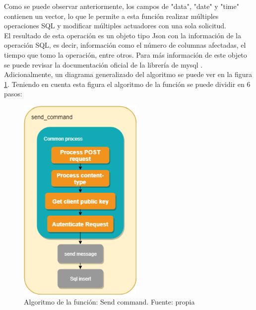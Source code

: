 Como se puede observar anteriormente, los campos de "data", "date" y "time" contienen un vector, lo que le permite a esta función realizar múltiples operaciones SQL y modificar múltiples actuadores con una sola solicitud.
\vspace{0.5cm}\\
El resultado de esta operación es un objeto tipo Json con la información de la operación SQL, es decir, información como el número de columnas afectadas, el tiempo que tomo la operación, entre otros. Para más información de este objeto se puede revisar la documentación oficial de la librería de mysql \cite{mysql}.
\vspace{0.5cm}\\
Adicionalmente, un diagrama generalizado del algoritmo se puede ver en la figura \ref{fig_29}. Teniendo en cuenta esta figura el algoritmo de la función se puede dividir en 6 pasos:

\begin{figure}[htbp]
	\centerline{\includegraphics[width=6cm]{figuras/algoritmo_send_command.png}}
	\caption{Algoritmo de la función: Send command. Fuente: propia}
	\label{fig_29}
\end{figure}

